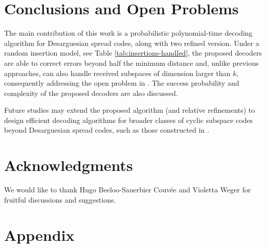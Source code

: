 \documentclass{article}
\begin{document}
\section{Conclusions and Open Problems}
\label{sec: Conclusions and Open Problems}
The main contribution of this work is a probabilistic polynomial-time decoding algorithm for Desarguesian spread codes, along with two refined version. Under a random insertion model, see Table \ref{tab:insertions-handled}, the proposed decoders are able to correct errors beyond half the minimum distance and, unlike previous approaches, can also handle received subspaces of dimension larger than $k$, consequently addressing the open problem in \cite{Gorla11}. The success probability and complexity of the proposed decoders are also discussed.

Future studies may extend the proposed algorithm (and relative refinements) to design efficient decoding algorithms for broader classes of cyclic subspace codes beyond Desarguesian spread codes, such as those constructed in \cite{roth2017construction}.   
\section*{Acknowledgments}
We would like to thank Hugo Beeloo-Sauerbier Couvée and Violetta Weger for fruitful discussions and suggestions.






\appendix
\section{Appendix}
\end{document}
